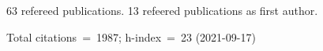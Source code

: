 63 refereed publications. 13 refeered publications as first author.

Total citations~=~1987; h-index~=~23 (2021-09-17)